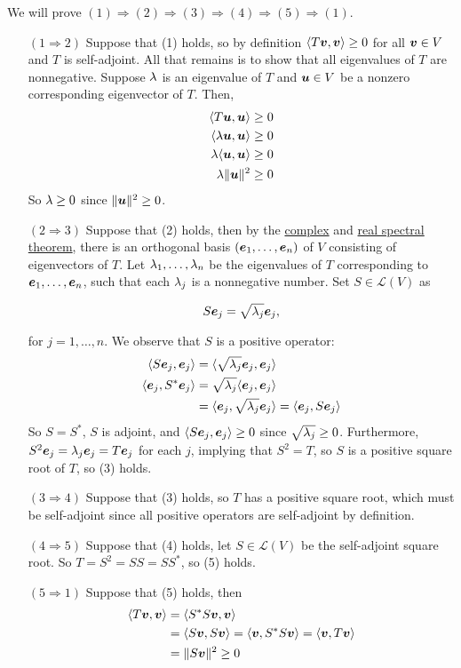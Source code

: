 \documentclass{report}
\newcommand{\cL}{\mathcal{L}}
\begin{document}
	\begin{myproof}
		We will prove $(1)\Rightarrow (2)\Rightarrow (3)\Rightarrow (4)\Rightarrow (5)\Rightarrow (1).$
		\begin{enumerate}
			\item[$(1\Rightarrow 2)$] Suppose that (1) holds, so by definition $\langle T\boldsymbol{v},\boldsymbol{v}\rangle\geq 0$ for all $\boldsymbol{v}\in V$ and $T$ is self-adjoint. All that remains is to show that all eigenvalues of $T$ are nonnegative. Suppose $\lambda$ is an eigenvalue of $T$ and $\boldsymbol{u}\in V$ be a nonzero corresponding eigenvector of $T$. Then,
			\begin{align*}
				\langle T\boldsymbol{u},\boldsymbol{u}\rangle&\geq 0\\
				\langle \lambda\boldsymbol{u},\boldsymbol{u}\rangle&\geq 0\\
				\lambda\langle \boldsymbol{u},\boldsymbol{u}\rangle&\geq 0\\
				\lambda\|\boldsymbol{u}\|^2&\geq 0
			\end{align*}
			So $\lambda\geq 0$ since $\|\boldsymbol{u}\|^2\geq 0$.
			\item[$(2\Rightarrow 3)$] Suppose that (2) holds, then by the \hyperref[sec:Thm5]{complex} and \hyperref[sec:Thm6]{real spectral theorem}, there is an orthogonal basis $(\boldsymbol{e}_1,\ldots,\boldsymbol{e}_n)$ of $V$ consisting of eigenvectors of $T$. Let $\lambda_1,\ldots,\lambda_n$ be the eigenvalues of $T$ corresponding to $\boldsymbol{e}_1,\ldots,\boldsymbol{e}_n$, such that each $\lambda_j$ is a nonnegative number. Set $S\in\cL(V)$ as
			
			$$S\boldsymbol{e}_j=\sqrt{\lambda_j}\boldsymbol{e}_j,$$
			
			for $j=1,\ldots,n$. We observe that $S$ is a positive operator:
			\begin{align*}
				\langle S\boldsymbol{e}_j,\boldsymbol{e}_j\rangle &= \langle\sqrt{\lambda_j}\boldsymbol{e}_j,\boldsymbol{e}_j\rangle\\
				\langle \boldsymbol{e}_j,S^*\boldsymbol{e}_j\rangle &= \sqrt{\lambda_j}\langle\boldsymbol{e}_j,\boldsymbol{e}_j\rangle\\
				&=\langle\boldsymbol{e}_j,\sqrt{\lambda_j}\boldsymbol{e}_j\rangle=\langle\boldsymbol{e}_j,S\boldsymbol{e}_j\rangle
			\end{align*}
			So $S=S^*$, $S$ is adjoint, and $\langle S\boldsymbol{e}_j,\boldsymbol{e}_j\rangle \geq 0$ since $\sqrt{\lambda_j}\geq 0$. Furthermore, $S^2\boldsymbol{e}_j=\lambda_j\boldsymbol{e}_j=T\boldsymbol{e}_j$ for each $j$, implying that $S^2=T$, so $S$ is a positive square root of $T$, so (3) holds.
			\item[$(3\Rightarrow 4)$] Suppose that (3) holds, so $T$ has a positive square root, which must be self-adjoint since all positive operators are self-adjoint by definition.
			\item[$(4\Rightarrow 5)$] Suppose that (4) holds, let $S\in\cL(V)$ be the self-adjoint square root. So $T=S^2=SS=SS^*$, so (5) holds.
			\item[$(5\Rightarrow 1)$] Suppose that (5) holds, then 
			\begin{align*}
				\langle T\boldsymbol{v},\boldsymbol{v}\rangle&=\langle S^*S\boldsymbol{v},\boldsymbol{v}\rangle\\
				&=\langle S\boldsymbol{v},S\boldsymbol{v}\rangle = \langle \boldsymbol{v},S^*S\boldsymbol{v}\rangle =\langle \boldsymbol{v},T\boldsymbol{v}\rangle\\
				&= \|S\boldsymbol{v}\|^2\geq 0
			\end{align*}
		\end{enumerate}
	\end{myproof}
	
\end{document}
